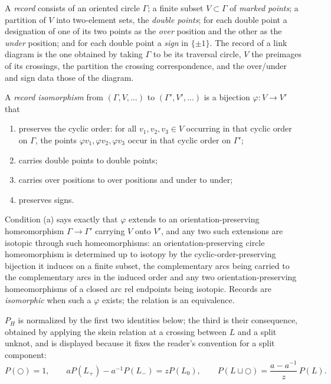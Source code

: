 \begin{definition}\label{CV:def:record}\leanok
A \emph{record} consists of an oriented circle $\Gamma$; a finite subset
$V\subset\Gamma$ of \emph{marked points}; a partition of $V$ into two-element
sets, the \emph{double points}; for each double point a designation of one of
its two points as the \emph{over} position and the other as the \emph{under}
position; and for each double point a \emph{sign} in $\{\pm1\}$. The record of a
link diagram is the one obtained by taking $\Gamma$ to be its traversal circle,
$V$ the preimages of its crossings, the partition the crossing correspondence,
and the over/under and sign data those of the diagram.

A \emph{record isomorphism} from $(\Gamma,V,\dots)$ to $(\Gamma',V',\dots)$ is a
bijection $\varphi:V\to V'$ that
\begin{enumerate}
\item[(a)] preserves the cyclic order: for all $v_1,v_2,v_3\in V$ occurring in
that cyclic order on $\Gamma$, the points $\varphi v_1,\varphi v_2,\varphi v_3$
occur in that cyclic order on $\Gamma'$;
\item[(b)] carries double points to double points;
\item[(c)] carries over positions to over positions and under to under;
\item[(d)] preserves signs.
\end{enumerate}
Condition (a) says exactly that $\varphi$ extends to an orientation-preserving
homeomorphism $\Gamma\to\Gamma'$ carrying $V$ onto $V'$, and any two such
extensions are isotopic through such homeomorphisms: an orientation-preserving
circle homeomorphism is determined up to isotopy by the cyclic-order-preserving
bijection it induces on a finite subset, the complementary arcs being carried to
the complementary arcs in the induced order and any two orientation-preserving
homeomorphisms of a closed arc rel endpoints being isotopic. Records are
\emph{isomorphic} when such a $\varphi$ exists; the relation is an equivalence.
\end{definition}

\begin{definition}\label{CV:def:homfly}\leanok
$P_H$ is normalized by the first two identities below; the third is their
consequence, obtained by applying the skein relation at a crossing between $L$
and a split unknot, and is displayed because it fixes the reader's convention
for a split component:
\begin{equation}
P(\bigcirc)=1,\qquad
aP(L_+)-a^{-1}P(L_-)=zP(L_0),\qquad
P(L\sqcup\bigcirc)=\frac{a-a^{-1}}{z}\,P(L).
\label{CV:eq:homfly}
\end{equation}
\end{definition}

